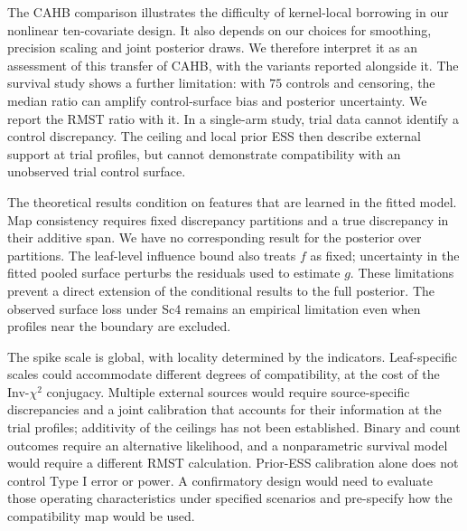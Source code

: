 \documentclass[11pt]{article}
\theoremstyle{definition}
\theoremstyle{plain}
\begin{document}
The CAHB comparison illustrates the difficulty of kernel-local borrowing in our nonlinear ten-covariate design. It also depends on our choices for smoothing, precision scaling and joint posterior draws. We therefore interpret it as an assessment of this transfer of CAHB, with the variants reported alongside it. The survival study shows a further limitation: with $75$ controls and censoring, the median ratio can amplify control-surface bias and posterior uncertainty. We report the RMST ratio with it. In a single-arm study, trial data cannot identify a control discrepancy. The ceiling and local prior ESS then describe external support at trial profiles, but cannot demonstrate compatibility with an unobserved trial control surface.

The theoretical results condition on features that are learned in the fitted model. Map consistency requires fixed discrepancy partitions and a true discrepancy in their additive span. We have no corresponding result for the posterior over partitions. The leaf-level influence bound also treats $f$ as fixed; uncertainty in the fitted pooled surface perturbs the residuals used to estimate $g$. These limitations prevent a direct extension of the conditional results to the full posterior. The observed surface loss under Sc4 remains an empirical limitation even when profiles near the boundary are excluded.

The spike scale is global, with locality determined by the indicators. Leaf-specific scales could accommodate different degrees of compatibility, at the cost of the Inv-$\chi^2$ conjugacy. Multiple external sources would require source-specific discrepancies and a joint calibration that accounts for their information at the trial profiles; additivity of the ceilings has not been established. Binary and count outcomes require an alternative likelihood, and a nonparametric survival model would require a different RMST calculation. Prior-ESS calibration alone does not control Type I error or power. A confirmatory design would need to evaluate those operating characteristics under specified scenarios and pre-specify how the compatibility map would be used.
\end{document}
